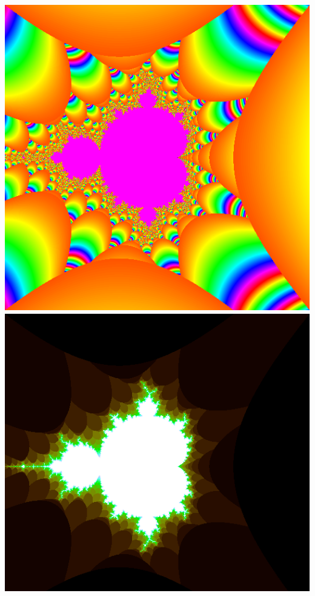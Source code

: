 \documentclass[../r.tex]{subfiles}
\begin{document}
\noindent
\includegraphics[scale=0.15]{../TAing/mandel/rainbow.png}
\includegraphics[scale=0.15]{../TAing/mandel/light.png}
\end{document}
